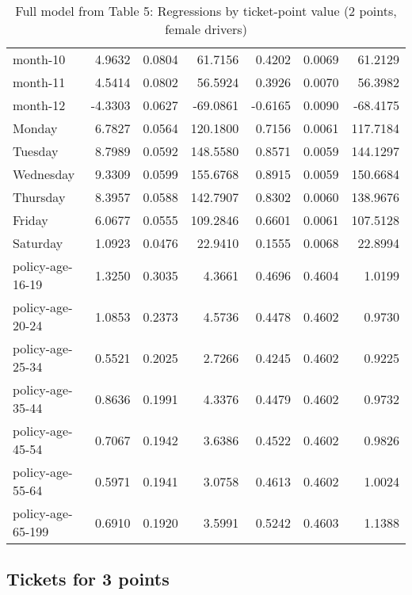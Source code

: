 \documentclass[10pt]{article}
\begin{document}
\begin{table}[ht]
\begin{tabular}{lrrrrrr}
  month-10 & 4.9632 & 0.0804 & 61.7156 & 0.4202 & 0.0069 & 61.2129 \\ 
  month-11 & 4.5414 & 0.0802 & 56.5924 & 0.3926 & 0.0070 & 56.3982 \\ 
  month-12 & -4.3303 & 0.0627 & -69.0861 & -0.6165 & 0.0090 & -68.4175 \\ 
  Monday & 6.7827 & 0.0564 & 120.1800 & 0.7156 & 0.0061 & 117.7184 \\ 
  Tuesday & 8.7989 & 0.0592 & 148.5580 & 0.8571 & 0.0059 & 144.1297 \\ 
  Wednesday & 9.3309 & 0.0599 & 155.6768 & 0.8915 & 0.0059 & 150.6684 \\ 
  Thursday & 8.3957 & 0.0588 & 142.7907 & 0.8302 & 0.0060 & 138.9676 \\ 
  Friday & 6.0677 & 0.0555 & 109.2846 & 0.6601 & 0.0061 & 107.5128 \\ 
  Saturday & 1.0923 & 0.0476 & 22.9410 & 0.1555 & 0.0068 & 22.8994 \\ 
  policy-age-16-19 & 1.3250 & 0.3035 & 4.3661 & 0.4696 & 0.4604 & 1.0199 \\ 
  policy-age-20-24 & 1.0853 & 0.2373 & 4.5736 & 0.4478 & 0.4602 & 0.9730 \\ 
  policy-age-25-34 & 0.5521 & 0.2025 & 2.7266 & 0.4245 & 0.4602 & 0.9225 \\ 
  policy-age-35-44 & 0.8636 & 0.1991 & 4.3376 & 0.4479 & 0.4602 & 0.9732 \\ 
  policy-age-45-54 & 0.7067 & 0.1942 & 3.6386 & 0.4522 & 0.4602 & 0.9826 \\ 
  policy-age-55-64 & 0.5971 & 0.1941 & 3.0758 & 0.4613 & 0.4602 & 1.0024 \\ 
  policy-age-65-199 & 0.6910 & 0.1920 & 3.5991 & 0.5242 & 0.4603 & 1.1388 \\ 
   \hline
\end{tabular}
\caption{Full model from Table 5: Regressions by ticket-point value (2 points, female drivers)} 
\label{tab_5_2_pts_F}
\end{table}


\clearpage
\pagebreak




\subsection{Tickets for 3 points}



\end{document}
